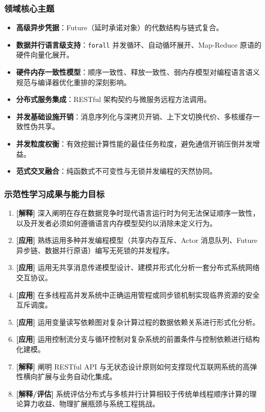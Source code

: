 \subsubsection{领域核心主题}
\begin{itemize}
    \item \textbf{高级异步凭据}：Future（延时承诺对象）的代数结构与链式复合。
    \item \textbf{数据并行语言级支持}：\texttt{forall} 并发循环、自动循环展开、Map-Reduce 原语的硬件向量化展开。
    \item \textbf{硬件内存一致性模型}：顺序一致性、释放一致性、弱内存模型对编程语言语义规范与编译器优化重排的深刻影响。
    \item \textbf{分布式服务集成}：RESTful 架构契约与微服务远程方法调用。
    \item \textbf{并发基础设施开销}：消息序列化与深拷贝开销、上下文切换代价、多核缓存一致性伪共享。
    \item \textbf{并发粒度权衡}：有效挖掘计算性能的最佳任务粒度，避免通信开销压倒并发增益。
    \item \textbf{范式交叉融合}：纯函数式不可变性与无锁并发编程的天然协同。
\end{itemize}

\subsubsection{示范性学习成果与能力目标}
\begin{enumerate}
    \item \textbf{[解释]} 深入阐明在存在数据竞争时现代语言运行时为何无法保证顺序一致性，以及开发者必须如何遵循语言内存模型契约以消除未定义行为。
    \item \textbf{[应用]} 熟练运用多种并发编程模型（共享内存互斥、Actor 消息队列、Future 异步链、数据并行原语）编写无死锁的并发程序。
    \item \textbf{[应用]} 运用无共享消息传递模型设计、建模并形式化分析一套分布式系统网络交互协议。
    \item \textbf{[应用]} 在多线程高并发系统中正确运用管程或同步锁机制实现临界资源的安全互斥调度。
    \item \textbf{[应用]} 运用变量读写依赖图对复杂计算过程的数据依赖关系进行形式化分析。
    \item \textbf{[应用]} 运用控制流分支与循环控制对复杂系统的前置条件与控制依赖进行结构化建模。
    \item \textbf{[解释]} 阐明 RESTful API 与无状态设计原则如何支撑现代互联网系统的高弹性横向扩展与业务自动化集成。
    \item \textbf{[解释/评估]} 系统评估分布式与多核并行计算相较于传统单线程顺序计算的理论算力收益、物理扩展瓶颈与系统工程挑战。
\end{enumerate}

